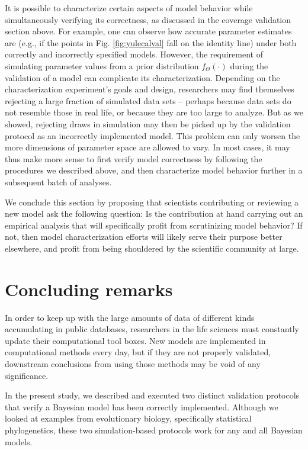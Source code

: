 \documentclass[oneside]{article}
\begin{document}
It is possible to characterize certain aspects of model behavior while simultaneously verifying its correctness, as discussed in the coverage validation section above.
For example, one can observe how accurate parameter estimates are (e.g., if the points in Fig. \ref{fig:yulecalval} fall on the identity line) under both correctly and incorrectly specified models.
However, the requirement of simulating parameter values from a prior distribution $f_{\Theta}(\cdot)$ during the validation of a model can complicate its characterization.
Depending on the characterization experiment's goals and design, researchers may find themselves rejecting a large fraction of simulated data sets -- perhaps because data sets do not resemble those in real life, or because they are too large to analyze.
But as we showed, rejecting draws in simulation may then be picked up by the validation protocol as an incorrectly implemented model.
This problem can only worsen the more dimensions of parameter space are allowed to vary.
In most cases, it may thus make more sense to first verify model correctness by following the procedures we described above, and then characterize model behavior further in a subsequent batch of analyses.

We conclude this section by proposing that scientists contributing or reviewing a new model ask the following question: Is the contribution at hand carrying out an empirical analysis that will specifically profit from scrutinizing model behavior?
If not, then model characterization efforts will likely serve their purpose better elsewhere, and profit from being shouldered by the scientific community at large.


\section*{Concluding remarks}

In order to keep up with the large amounts of data of different kinds accumulating in public databases, researchers in the life sciences must constantly update their computational tool boxes.
New models are implemented in computational methods every day, but if they are not properly validated, downstream conclusions from using those methods may be void of any significance.

In the present study, we described and executed two distinct validation protocols that verify a Bayesian model has been correctly implemented.
Although we looked at examples from evolutionary biology, specifically statistical phylogenetics, these two simulation-based protocols work for any and all Bayesian models.
\end{document}
